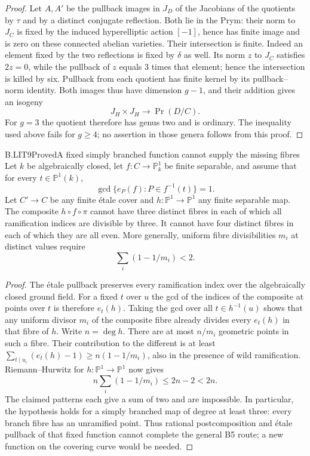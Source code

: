 \begin{proof}
Let $A,A'$ be the pullback images in $J_D$ of the
Jacobians of the quotients by $\tau$ and by a distinct
conjugate reflection. Both lie in the Prym: their
norm to $J_C$ is fixed by the induced hyperelliptic
action $[-1]$, hence has finite image and is zero
on these connected abelian varieties. Their
intersection is finite. Indeed an element fixed by
the two reflections is fixed by $\delta$ as well.
Its norm $z$ to $J_C$ satisfies $2z=0$, while the
pullback of $z$ equals $3$ times that element; hence
the intersection is killed by six. Pullback from
each quotient has finite kernel by its pullback--norm
identity. Both images thus have dimension $g-1$,
and their addition gives an isogeny
\[
 J_H\times J_H\longrightarrow\Pr(D/C).
\]
For $g=3$ the quotient therefore has genus two and
is ordinary.
The inequality used above fails for $g\ge4$; no
assertion in those genera follows from this proof.
\end{proof}

\begin{claim}{B.LIT9}{Proved}{A fixed simply branched function cannot supply the missing fibres}
Let $k$ be algebraically closed, let $f:C\to\mathbb P^1_k$
be finite separable, and assume that for every
$t\in\mathbb P^1(k)$,
\[
 \gcd\{e_P(f):P\in f^{-1}(t)\}=1.
\]
Let $C'\to C$ be any finite \'etale cover and
$h:\mathbb P^1\to\mathbb P^1$ any finite separable map.
The composite $h\circ f\circ\pi$ cannot have three
distinct fibres in each of which all ramification
indices are divisible by three. It cannot have four
distinct fibres in each of which they are all even.
More generally, uniform fibre divisibilities $m_i$
at distinct values require
\[
 \sum_i(1-1/m_i)<2.
\]
\end{claim}

\begin{proof}
The \'etale pullback preserves every ramification index
over the algebraically closed ground field. For a
fixed $t$ over $u$ the gcd of the indices of the
composite at points over $t$ is therefore $e_t(h)$.
Taking the gcd over all $t\in h^{-1}(u)$ shows that
any uniform divisor $m_i$ of the composite fibre
already divides every $e_t(h)$ in that fibre of $h$.
Write $n=\deg h$. There are at most $n/m_i$ geometric
points in such a fibre. Their contribution to the
different is at least
$\sum_{t\mid u_i}(e_t(h)-1)\ge n(1-1/m_i)$,
also in the presence of wild ramification.
Riemann--Hurwitz for $h:\mathbb P^1\to\mathbb P^1$
now gives
\[
 n\sum_i(1-1/m_i)\le2n-2<2n.
\]
The claimed patterns each give a sum of two and are
impossible. In particular, the hypothesis holds for
a simply branched map of degree at least three:
every branch fibre has an unramified point. Thus
rational postcomposition and \'etale pullback of that
fixed function cannot complete the general B5 route;
a new function on the covering curve would be needed.
\end{proof}

